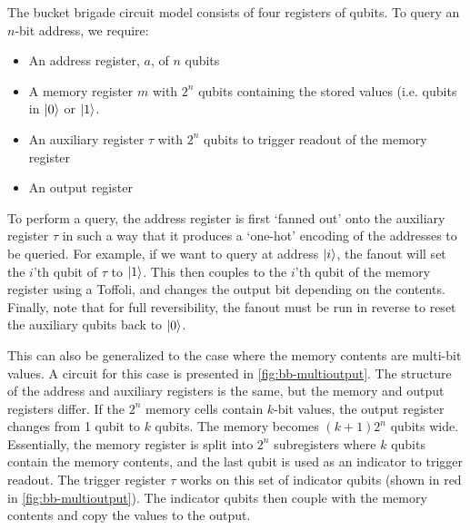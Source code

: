 \documentclass[a4paper,12pt]{article}
\begin{document}
The bucket brigade circuit model consists of four registers of qubits. To query an $n$-bit address, we require:
\begin{itemize}
 \item An address register, $a$, of $n$ qubits
 \item A memory register $m$ with $2^n$ qubits containing the stored values (i.e. qubits in $\ket{0}$ or $\ket{1}$.
 \item An auxiliary register $\tau$ with $2^n$ qubits to trigger readout of the memory register
 \item An output register
\end{itemize}

To perform a query, the address register is first `fanned out' onto the auxiliary register $\tau$ in such a way that it produces a `one-hot' encoding of the addresses to be queried. For example, if we want to query at address $\ket{i}$, the fanout will set the $i$'th qubit of $\tau$ to $\ket{1}$. This then couples to the $i$'th qubit of the memory register using a Toffoli, and changes the output bit depending on the contents. Finally, note that for full reversibility, the fanout must be run in reverse to reset the auxiliary qubits back to $\ket{0}$. 

This can also be generalized to the case where the memory contents are multi-bit values. A circuit for this case is presented in \autoref{fig:bb-multioutput}. The structure of the address and auxiliary registers is the same, but the memory and output registers differ. If the $2^n$ memory cells contain $k$-bit values, the output register changes from 1 qubit to $k$ qubits.  The memory becomes $(k+1)2^n$ qubits wide. Essentially, the memory register is split into $2^n$ subregisters where $k$ qubits contain the memory contents, and the last qubit is used as an indicator to trigger readout. The trigger register $\tau$ works on this set of indicator qubits (shown in red in \autoref{fig:bb-multioutput}). The indicator qubits then couple with the memory contents and copy the values to the output.
\end{document}
